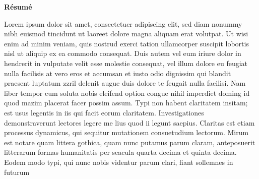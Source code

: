 \begin{headingpage}
\thispagestyle{empty}

\begin{center}\Large \textbf{Résumé}\end{center}

Lorem ipsum dolor sit amet, consectetuer adipiscing elit, sed diam nonummy nibh
euismod tincidunt ut laoreet dolore magna aliquam erat volutpat. Ut wisi enim ad
minim veniam, quis nostrud exerci tation ullamcorper suscipit lobortis nisl ut
aliquip ex ea commodo consequat. Duis autem vel eum iriure dolor in hendrerit in
vulputate velit esse molestie consequat, vel illum dolore eu feugiat nulla
facilisis at vero eros et accumsan et iusto odio dignissim qui blandit praesent
luptatum zzril delenit augue duis dolore te feugait nulla facilisi. Nam liber
tempor cum soluta nobis eleifend option congue nihil imperdiet doming id quod
mazim placerat facer possim assum. Typi non habent claritatem insitam; est usus
legentis in iis qui facit eorum claritatem. Investigationes demonstraverunt
lectores legere me lius quod ii legunt saepius. Claritas est etiam processus
dynamicus, qui sequitur mutationem consuetudium lectorum. Mirum est notare quam
littera gothica, quam nunc putamus parum claram, anteposuerit litterarum formas
humanitatis per seacula quarta decima et quinta decima. Eodem modo typi, qui
nunc nobis videntur parum clari, fiant sollemnes in futurum






\end{headingpage}
